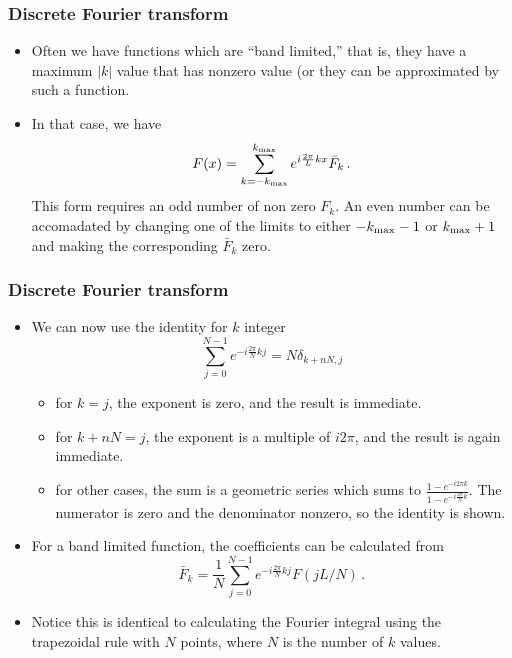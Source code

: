\documentclass{beamer}
\begin{document}
\begin{frame}
\frametitle{Discrete Fourier transform}
\begin{itemize}
\item
Often we have functions which are ``band limited,'' that is, they
have a maximum $|k|$ value that has nonzero value (or they can be
approximated by such a function.

\item
In that case, we have
\begin{equation}
F(x) = \sum_{k=-k_{\rm max}}^{k_{\rm max}} e^{i \frac{2\pi}{L} kx  } \bar F_k\,.
\end{equation}
This form requires an odd number of non zero $F_k$. An even number can
be accomadated by changing one of the limits to either $-k_{\rm max}-1$ or
$k_{\rm max}+1$ and making the corresponding $\bar F_k$ zero.
\end{itemize}
\end{frame}
\begin{frame}
\frametitle{Discrete Fourier transform}
\begin{itemize}
\item
We can now use the identity for $k$ integer
\begin{equation}
\sum_{j=0}^{N-1} e^{-i \frac{2\pi}{N} k j} = N \delta_{k+nN,j}
\end{equation}
\begin{itemize}
\item
for $k=j$, the exponent is zero, and the result is immediate.
\item
for $k + n N = j$, the exponent is a multiple of $i 2\pi$, and the result
is again immediate.
\item
for other cases, the sum is a geometric series which sums to
$\frac{1-e^{-i 2\pi k}}{1-e^{-i\frac{2\pi}{N} k}}$.
The numerator is zero and the denominator nonzero, so the identity is shown.
\end{itemize}

\item
For a band limited function, the coefficients can be calculated from
\begin{equation}
\bar F_k = \frac{1}{N} \sum_{j=0}^{N-1} e^{-i\frac{2\pi}{N} k j} F(j L/N) \,.
\end{equation}
\item
Notice this is identical to calculating the Fourier integral using
the trapezoidal rule with $N$ points, where $N$ is the number of
$k$ values.
\end{itemize}
\end{frame}
\end{document}
